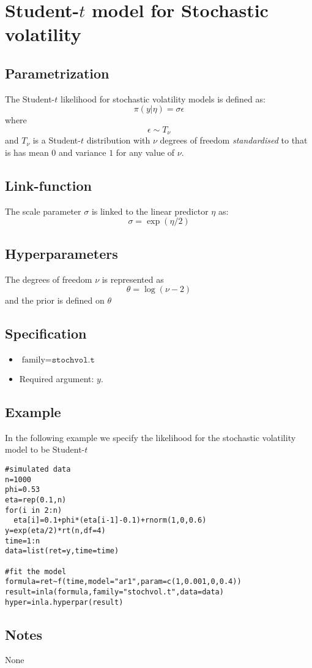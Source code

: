 \documentclass[a4paper,11pt]{article}
\begin{document}
\section*{Student-$t$ model for Stochastic volatility}

\subsection*{Parametrization}

The Student-$t$ likelihood for stochastic volatility models is defined as:
\[
\pi(y |\eta )=\sigma \epsilon 
\]
where
\[
\epsilon \sim T_{\nu}
\]
and $T_{\nu}$ is a Student-$t$ distribution with $\nu$ degrees of freedom {\it standardised} to that is has mean $0$ and variance $1$ for any value of $\nu$.

\subsection*{Link-function}

The scale parameter $\sigma $ is linked to the linear predictor $\eta $ as:
\[
\sigma =\exp(\eta /2)
\]

\subsection*{Hyperparameters}

The degrees of freedom $\nu$ is represented as
\[
\theta=\log(\nu-2)
\]
and the prior is defined on $\theta$

\subsection*{Specification}

\begin{itemize}
\item $\text{family}=\texttt{stochvol.t}$
\item Required argument: $y$.
\end{itemize}

\subsection*{Example}
In the following example we specify the likelihood for the stochastic volatility model to be Student-$t$ 
 
\begin{verbatim}
#simulated data
n=1000
phi=0.53
eta=rep(0.1,n)
for(i in 2:n)
  eta[i]=0.1+phi*(eta[i-1]-0.1)+rnorm(1,0,0.6)
y=exp(eta/2)*rt(n,df=4)
time=1:n
data=list(ret=y,time=time)

#fit the model
formula=ret~f(time,model="ar1",param=c(1,0.001,0,0.4))
result=inla(formula,family="stochvol.t",data=data)
hyper=inla.hyperpar(result)

\end{verbatim}

\subsection*{Notes}

None
\end{document}
